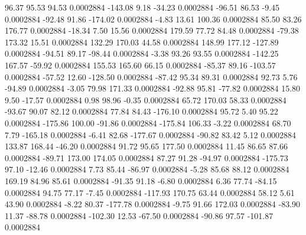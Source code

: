        96.37       95.53       94.53     0.0002884
     -143.08        9.18      -34.23     0.0002884
      -96.51       86.53       -9.45     0.0002884
      -92.48       91.86     -174.02     0.0002884
       -4.83       13.61      100.36     0.0002884
       85.50       83.26      176.77     0.0002884
      -18.34        7.50       15.56     0.0002884
      179.59       77.72       84.48     0.0002884
      -79.38      173.32       15.51     0.0002884
      132.29      170.03       44.58     0.0002884
      148.99      177.12     -127.89     0.0002884
      -94.51       89.17      -98.44     0.0002884
       -3.38       93.26       93.55     0.0002884
     -142.25      167.57      -59.92     0.0002884
      155.53      165.60       66.15     0.0002884
      -85.37       89.16     -103.57     0.0002884
      -57.52       12.60     -128.50     0.0002884
      -87.42       95.34       89.31     0.0002884
       92.73        5.76      -94.89     0.0002884
       -3.05       79.98      171.33     0.0002884
      -92.88       95.81      -77.82     0.0002884
       15.80        9.50      -17.57     0.0002884
        0.98       98.96       -0.35     0.0002884
       65.72      170.03       58.33     0.0002884
      -93.67       90.07       82.12     0.0002884
       77.84       84.43     -176.10     0.0002884
       95.72        5.40       95.22     0.0002884
     -175.86      100.00      -91.86     0.0002884
     -175.84      106.33       -3.22     0.0002884
       68.70        7.79     -165.18     0.0002884
       -6.41       82.68     -177.67     0.0002884
      -90.82       83.42        5.12     0.0002884
      133.87      168.44      -46.20     0.0002884
       91.72       95.65      177.50     0.0002884
       11.45       86.65       87.66     0.0002884
      -89.71      173.00      174.05     0.0002884
       87.27       91.28      -94.97     0.0002884
     -175.73       97.10      -12.46     0.0002884
        7.73       85.44      -86.97     0.0002884
       -5.28       85.68       88.12     0.0002884
      169.19       84.96       85.61     0.0002884
      -91.35       91.18       -6.80     0.0002884
        6.36       77.74      -84.15     0.0002884
       94.75       77.17       -7.45     0.0002884
     -117.93      170.75       63.44     0.0002884
       58.12        5.61       43.90     0.0002884
       -8.22       80.37     -177.78     0.0002884
       -9.75       91.66      172.03     0.0002884
      -83.90       11.37      -88.78     0.0002884
     -102.30       12.53      -67.50     0.0002884
      -90.86       97.57     -101.87     0.0002884
